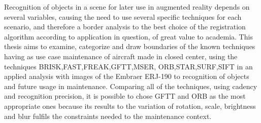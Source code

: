 Recognition of objects in a scene for later use in augmented reality depends on several variables, causing the need 
to use several specific techniques for each scenario, and therefore a border
analysis to the best choice of the registration algorithm according to
application in question, of great value to academia.
This thesis aims to examine, categorize and draw boundaries of the known techniques having as use case maintenance of 
aircraft made in closed center, using the techniques BRISK,FAST,FREAK,GFTT,MSER,
ORB,STAR,SURF,SIFT in an applied analysis with images of the Embraer ERJ-190 to recognition
 of objects and future usage in maintenance. Comparing all of the techniques, using cadency and
  recognition precision, it is possible to chose GFTT and ORB as the most appropriate ones because its results to the variation of
rotation, scale, brightness and blur fulfils the constraints needed to the
maintenance context.
